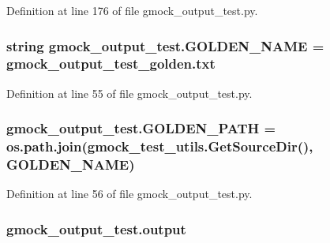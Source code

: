 Definition at line 176 of file gmock\+\_\+output\+\_\+test.\+py.

\subsubsection[{\texorpdfstring{G\+O\+L\+D\+E\+N\+\_\+\+N\+A\+ME}{GOLDEN_NAME}}]{\setlength{\rightskip}{0pt plus 5cm}string gmock\+\_\+output\+\_\+test.\+G\+O\+L\+D\+E\+N\+\_\+\+N\+A\+ME = \textquotesingle{}gmock\+\_\+output\+\_\+test\+\_\+golden.\+txt\textquotesingle{}}\hypertarget{namespacegmock__output__test_ac6e9298ea3967e6fa704c9c246d6cc18}{}\label{namespacegmock__output__test_ac6e9298ea3967e6fa704c9c246d6cc18}


Definition at line 55 of file gmock\+\_\+output\+\_\+test.\+py.

\subsubsection[{\texorpdfstring{G\+O\+L\+D\+E\+N\+\_\+\+P\+A\+TH}{GOLDEN_PATH}}]{\setlength{\rightskip}{0pt plus 5cm}gmock\+\_\+output\+\_\+test.\+G\+O\+L\+D\+E\+N\+\_\+\+P\+A\+TH = os.\+path.\+join({\bf gmock\+\_\+test\+\_\+utils.\+Get\+Source\+Dir}(), {\bf G\+O\+L\+D\+E\+N\+\_\+\+N\+A\+ME})}\hypertarget{namespacegmock__output__test_a632c0fbf08500e4ed3c0e33f5e2ac771}{}\label{namespacegmock__output__test_a632c0fbf08500e4ed3c0e33f5e2ac771}


Definition at line 56 of file gmock\+\_\+output\+\_\+test.\+py.

\subsubsection[{\texorpdfstring{output}{output}}]{\setlength{\rightskip}{0pt plus 5cm}gmock\+\_\+output\+\_\+test.\+output}\hypertarget{namespacegmock__output__test_a4277f8598ba3835393fe82e82d09375d}{}\label{namespacegmock__output__test_a4277f8598ba3835393fe82e82d09375d}


